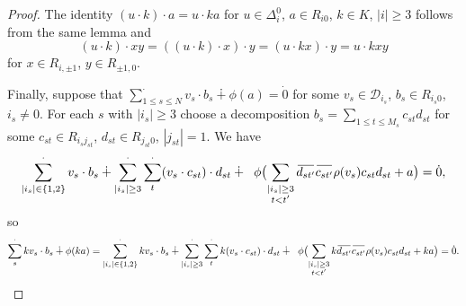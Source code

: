 \documentclass{article}
\theoremstyle{definition}
\newcommand{\inv}[1]{
    \!\;\overline{
        \!\!\:#1\vphantom !\!\!\:
    }\;\!
}
\begin{document}
\begin{proof}
    The identity \((u \cdot k) \cdot a = u \cdot ka\) for \(u \in \Delta^0_i\), \(a \in R_{i0}\), \(k \in K\), \(|i| \geq 3\) follows from the same lemma and \[
        (u \cdot k) \cdot xy
        =
        ((u \cdot k) \cdot x) \cdot y
        =
        (u \cdot kx) \cdot y
        =
        u \cdot kxy
    \] for \(x \in R_{i, \pm 1}\), \(y \in R_{\pm 1, 0}\).

    Finally, suppose that \(
        \sum^\cdot_{1 \leq s \leq N} v_s \cdot b_s
        \dotplus \phi(a)
        = \dot 0
    \) for some \(
        v_s \in \mathcal D_{i_s}
    \), \(
        b_s \in R_{i_s 0}
    \), \(i_s \neq 0\). For each \(s\) with \(
        |i_s| \geq 3
    \) choose a decomposition \(
        b_s = \sum_{1 \leq t \leq M_s} c_{st} d_{st}
    \) for some \(
        c_{st} \in R_{i_s j_{st}}
    \), \(
        d_{st} \in R_{j_{st} 0}
    \), \(
        |j_{st}| = 1
    \). We have \[
        \sum^\cdot_{|i_s| \in \{1, 2\}}
            v_s \cdot b_s
        \dotplus \sum^\cdot_{|i_s| \geq 3}
            \sum^\cdot_t
                (v_s \cdot c_{st}) \cdot d_{st}
        \dotplus \phantom x
        \phi\bigl(
            \sum_{\substack{|i_s| \geq 3\\ t < t'} }
                \inv{d_{st'}} \inv{c_{st'}}
                \rho(v_s) c_{st} d_{st}
            + a
        \bigr)
        = \dot 0,
    \] so \[
        \sum^\cdot_s kv_s \cdot b_s
        \dotplus \phi(ka)
        =
        \sum^\cdot_{|i_s| \in \{1, 2\}}
            kv_s \cdot b_s
        \dotplus \sum^\cdot_{|i_s| \geq 3}
            \sum^\cdot_t
                k(v_s \cdot c_{st}) \cdot d_{st}
        \dotplus \phantom x
        \phi\bigl(
            \sum_{\substack{|i_s| \geq 3\\ t < t'} }
                k \inv{d_{st'}} \inv{c_{st'}}
                \rho(v_s) c_{st} d_{st}
            + ka
        \bigr)
        = \dot 0.
    \qedhere\]
\end{proof}
\end{document}
